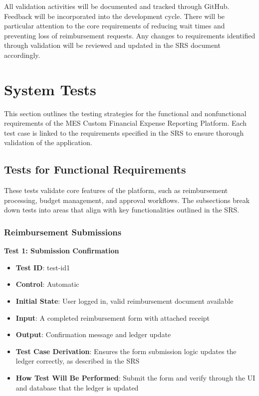 \documentclass[12pt, titlepage]{article}
\begin{document}
All validation activities will be documented and tracked through GitHub. Feedback will be incorporated into the development cycle. There will be particular attention to the core requirements of reducing wait times and preventing loss of reimbursement requests. Any changes to requirements identified through validation will be reviewed and updated in the SRS document accordingly.

\section{System Tests}

This section outlines the testing strategies for the functional and nonfunctional requirements of the MES Custom Financial Expense Reporting Platform. Each test case is linked to the requirements specified in the SRS to ensure thorough validation of the application.

\subsection{Tests for Functional Requirements}

These tests validate core features of the platform, such as reimbursement processing, budget management, and approval workflows. The subsections break down tests into areas that align with key functionalities outlined in the SRS.

\subsubsection{Reimbursement Submissions}

\textbf{Test 1: Submission Confirmation}
\begin{itemize}
    \item \textbf{Test ID}: test-id1
    \item \textbf{Control}: Automatic
    \item \textbf{Initial State}: User logged in, valid reimbursement document available
    \item \textbf{Input}: A completed reimbursement form with attached receipt
    \item \textbf{Output}: Confirmation message and ledger update
    \item \textbf{Test Case Derivation}: Ensures the form submission logic updates the ledger correctly, as described in the SRS
    \item \textbf{How Test Will Be Performed}: Submit the form and verify through the UI and database that the ledger is updated
\end{itemize}
\end{document}
